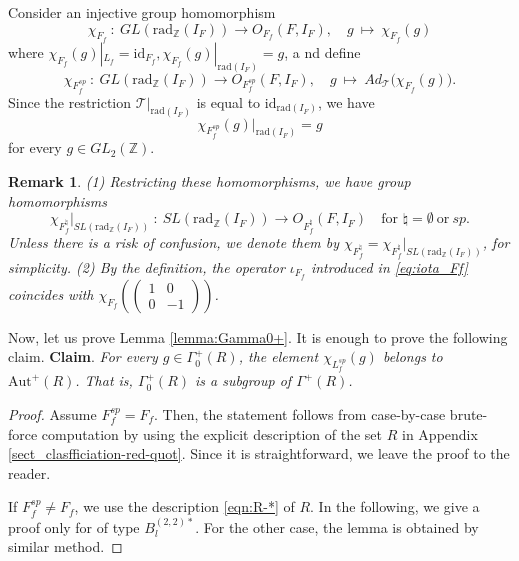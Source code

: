 \documentclass[11pt]{amsart}
\newtheorem{rem}[thm]{Remark}%
\begin{document}
{{Consider an injective group homomorphism
\begin{equation}\label{eq:split}
\chi_{F_f} \ : \ 
GL(\mathrm{rad}_{\mathbb{Z}}(I_F)) \longrightarrow O_{F_f}(F,I_F), \quad 
g\ \longmapsto \ \chi_{F_f}(g)
\end{equation}
where
$\chi_{F_f}(g)|_{L_f}=\mathrm{id}_{F_f}, \chi_{F_f}(g)|_{\mathrm{rad}(I_F)}=g$, a
nd define
\begin{equation*}\label{eq:split'}
\chi_{F_f^{sp}} \ : \ 
GL(\mathrm{rad}_{\mathbb{Z}}(I_F)) \longrightarrow O_{F_f^{sp}}(F,I_F), \quad 
g\ \longmapsto \ Ad_{\mathcal{T}}\big(\chi_{F_f}(g)\big).
\end{equation*}
Since the restriction $\mathcal{T}|_{\mathrm{rad}(I_F)}$ is equal to 
$\mathrm{id}_{\mathrm{rad}(I_F)}$, we have
\begin{equation*}\label{eqn:section'}
\chi_{F_f^{sp}}(g)|_{\mathrm{rad}(I_F)}=g
\end{equation*}
for every $g\in GL_2(\mathbb{Z})$. 

\begin{rem}\label{rem:chi_Lf}
{\rm (1) Restricting these homomorphisms, we have group homomorphisms
\[\chi_{F_f^{\natural}}|_{SL(\mathrm{rad}_{\mathbb{Z}}(I_F))} \ : \ 
SL(\mathrm{rad}_{\mathbb{Z}}(I_F)) \longrightarrow O_{F_f^{\natural}}(F,I_F)
\quad\mbox{for }\natural=\emptyset\ \mbox{or}\ sp. \]
Unless there is a risk of confusion, we denote them by 
$\chi_{F_f^{\natural}}=\chi_{F_f^{\natural}}|_{SL(\mathrm{rad}_{\mathbb{Z}}(I_F))}$, for
simplicity. 
\vskip 1mm
\noindent
(2) By the definition, the operator $\iota_{F_f}$ introduced in \eqref{eq:iota_Ff}
coincides with $\chi_{F_f}\left(\begin{pmatrix} 1 & 0\\ 0 & -1\end{pmatrix}\right)$.
}\end{rem}
\vskip 3mm
Now, let us prove Lemma \ref{lemma:Gamma0+}. It is enough to prove the following
claim. 
\vskip 3mm
\noindent
{\bf Claim}. 
{\it For every $g\in \Gamma_0^+(R)$, the element $\chi_{L_f^{sp}}(g)$ belongs to 
$\mathrm{Aut}^+(R)$. That is, $\Gamma_0^+(R)$ is a subgroup of 
$\Gamma^+(R)$. }

\begin{proof}
Assume $F_f^{sp}=F_f$. Then, the statement follows from case-by-case 
brute-force computation by using the explicit description of the set $R$ in 
Appendix \ref{sect_clasfficiation-red-quot}. Since it is straightforward,  
we leave the proof to the reader. 

If $F_f^{sp}\ne F_f$, we use the description \eqref{eqn:R-*} of $R$. In the following, 
we give a proof only for of type $B_l^{(2,2)\ast}$. For the other case, the lemma is 
obtained by similar method. 


\end{proof}}}
\end{document}
